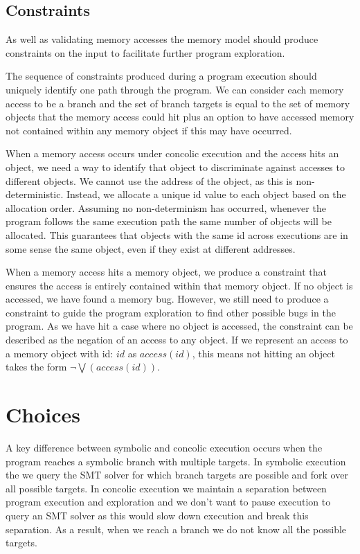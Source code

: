 \documentclass[12pt,twoside]{report}
\begin{document}
\subsection{Constraints}
As well as validating memory accesses the memory model should produce constraints on the input to facilitate further program exploration.

The sequence of constraints produced during a program execution should uniquely identify one path through the program. We can consider each memory access to be a branch and the set of branch targets is equal to the set of memory objects that the memory access could hit plus an option to have accessed memory not contained within any memory object if this may have occurred.

When a memory access occurs under concolic execution and the access hits an object, we need a way to identify that object to discriminate against accesses to different objects. We cannot use the address of the object, as this is non-deterministic. Instead, we allocate a unique id value to each object based on the allocation order. Assuming no non-determinism has occurred, whenever the program follows the same execution path the same number of objects will be allocated. This guarantees that objects with the same id across executions are in some sense the same object, even if they exist at different addresses.

When a memory access hits a memory object, we produce a constraint that ensures the access is entirely contained within that memory object. If no object is accessed, we have found a memory bug. However, we still need to produce a constraint to guide the program exploration to find other possible bugs in the program. As we have hit a case where no object is accessed, the constraint can be described as the negation of an access to any object. If we represent an access to a memory object with id: $id$ as $access(id)$, this means not hitting an object takes the form $\neg\bigvee(access(id))$.

\section{Choices}
A key difference between symbolic and concolic execution occurs when the program reaches a symbolic branch with multiple targets. In symbolic execution the we query the SMT solver for which branch targets are possible and fork over all possible targets. In concolic execution we maintain a separation between program execution and exploration and we don't want to pause execution to query an SMT solver as this would slow down execution and break this separation. As a result, when we reach a branch we do not know all the possible targets.
\end{document}
